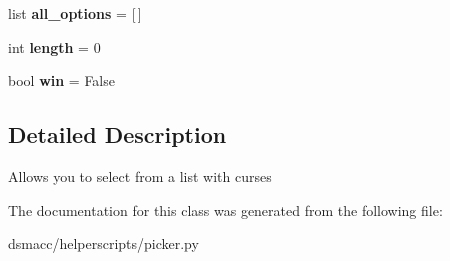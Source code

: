 \begin{DoxyCompactItemize}
list {\bfseries all\+\_\+options} = \mbox{[}$\,$\mbox{]}
\item 
\mbox{\label{classdsmacc_1_1helperscripts_1_1picker_1_1Picker_a7467bb8aee62fb241d2651c0ca06b909}} 
int {\bfseries length} = 0
\item 
\mbox{\label{classdsmacc_1_1helperscripts_1_1picker_1_1Picker_a898d01de405841e0945072220237cf62}} 
bool {\bfseries win} = False
\end{DoxyCompactItemize}


\subsection{Detailed Description}
\begin{DoxyVerb}Allows you to select from a list with curses\end{DoxyVerb}
 

The documentation for this class was generated from the following file\+:\begin{DoxyCompactItemize}
\item 
dsmacc/helperscripts/picker.\+py\end{DoxyCompactItemize}
